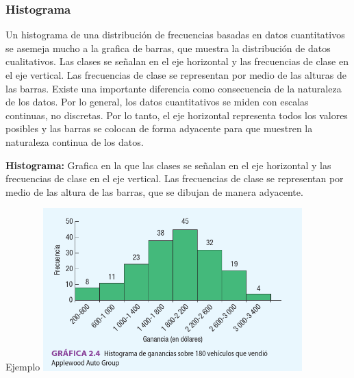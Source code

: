 \documentclass[]{article}
\begin{document}
\subsubsection*{Histograma}
Un histograma de una distribución de frecuencias basadas en datos cuantitativos se asemeja mucho a la grafica de barras, que muestra la distribución de datos cualitativos. Las clases se señalan en el eje horizontal y las frecuencias de clase en el eje vertical. Las frecuencias de clase se representan por medio de las alturas de las barras. Existe una importante diferencia como consecuencia de la naturaleza de los datos. Por lo general, los datos cuantitativos se miden con escalas continuas, no discretas. Por lo tanto, el eje horizontal representa todos los valores posibles y las barras se colocan de forma adyacente para que muestren la naturaleza continua de los datos.
\begin{center}
	\textbf{Histograma: }Grafica en la que las clases se señalan en el eje horizontal y las frecuencias de clase en el eje vertical. Las frecuencias de clase se representan por medio de las altura de las barras, que se dibujan de manera adyacente.
\end{center}
Ejemplo\linebreak
\includegraphics[width=10cm]{imagenes/HistogramaEjemploCap2.PNG}
\end{document}
